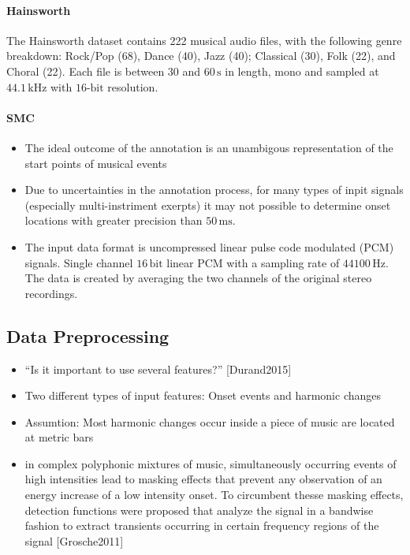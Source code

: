 \documentclass{scrartcl}
\begin{document}
\paragraph{Hainsworth} The Hainsworth dataset \cite{Hainsworth2004} contains 222 musical audio files, with the following genre breakdown: Rock/Pop (68), Dance (40), Jazz (40); Classical (30), Folk (22), and Choral (22). Each file is between $30$ and $60\,\text{s}$ in length, mono and sampled at $44.1\,\text{kHz}$ with $16\text{-bit}$ resolution.

\paragraph{SMC}




\begin{itemize}
\item The ideal outcome of the annotation is an unambigous representation of the start points of musical events
\item Due to uncertainties in the annotation process, for many types of inpit signals (especially multi-instriment exerpts) it may not possible to determine onset locations with greater precision than $50\,\text{ms}$. \cite{Leveau2004}
\item The input data format is uncompressed linear pulse code modulated (PCM) signals. Single channel $16\,\text{bit}$ linear PCM with a sampling rate of $44100\,\text{Hz}$. The data is created by averaging the two channels of the original stereo recordings.
\end{itemize}


\subsection{Data Preprocessing}

\begin{itemize}
\item ``Is it important to use several features?'' [Durand2015]
\item Two different types of input features: Onset events and harmonic changes
\item Assumtion: Most harmonic changes occur inside a piece of music are located at metric bars \cite[Khadkevich2012]{Khadkevich2012}
\item in complex polyphonic mixtures of music, simultaneously occurring events of high intensities lead to masking effects that prevent any observation of an energy increase of a low intensity onset. To circumbent thesse masking effects, detection functions were proposed that analyze the signal in a bandwise fashion to extract transients occurring in certain frequency regions of the signal [Grosche2011]
\end{itemize}
\end{document}
